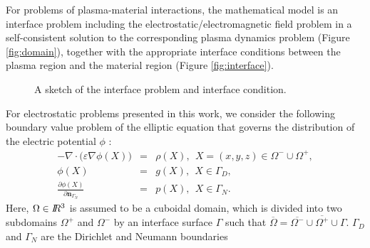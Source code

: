 \documentclass{siamart171218}
\begin{document}
For problems of plasma-material interactions,
the mathematical model
is an interface problem including
the electrostatic/electromagnetic field problem
in a self-consistent solution to the corresponding plasma dynamics problem
(Figure \ref{fig:domain}),
together with the appropriate interface conditions
between the plasma region and the material region (Figure \ref{fig:interface}).
\begin{figure}[ht!]
\centering
\begin{subfigmatrix}{2} %
%
%
\end{subfigmatrix}
\caption{A sketch of the interface problem and interface condition.}
\label{fig:sketch}
\end{figure}
For electrostatic problems presented in this work,  
we consider the following boundary value problem of the elliptic equation
that governs the distribution of the electric potential $\phi$
\cite{JDJackson_book_1}:
\begin{eqnarray}
-\nabla \cdot \big( \varepsilon \nabla \phi(X) \big) &=&
\rho(X),~~X=(x,y,z) \in {\Omega^- \cup \Omega^+},
\label{bvp_pde_nonhomogeneous flux jump} \\
\phi(X) &=& g(X),~~ X \in {\Gamma_D},
\label{eq:bvp_bc_nonhomogeneous flux jump} \\
 \frac{\partial \phi(X)}{\partial\textbf{n}_{\Gamma_N}} &=& p(X),~~ X \in {\Gamma_N}.
\label{eq:bvp_bc2_nonhomogeneous flux jump}
\end{eqnarray}
Here, $\Omega\in I\!\!R^3$ is assumed to be a cuboidal domain,
which is divided into two subdomains $\Omega^+$ and $\Omega^-$
by an interface surface $\Gamma$ such that
$\overline{\Omega}= \overline{\Omega^-} \cup \overline{\Omega^+} \cup \Gamma$.
$\Gamma_D$ and $\Gamma_N$ are the Dirichlet and Neumann boundaries
\end{document}
